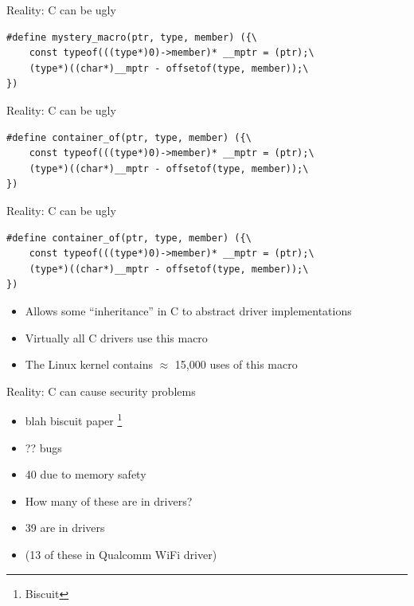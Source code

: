 \documentclass[NET,english,aspectratio=169,notitleframe]{tumbeamer}
\begin{document}
\begin{frame}[fragile]{Reality: C can be ugly}
\begin{verbatim}
#define mystery_macro(ptr, type, member) ({\
	const typeof(((type*)0)->member)* __mptr = (ptr);\
	(type*)((char*)__mptr - offsetof(type, member));\
})
\end{verbatim}
\end{frame}

\begin{frame}[fragile]{Reality: C can be ugly}
\begin{verbatim}
#define container_of(ptr, type, member) ({\
	const typeof(((type*)0)->member)* __mptr = (ptr);\
	(type*)((char*)__mptr - offsetof(type, member));\
})
\end{verbatim}
\end{frame}


\begin{frame}[fragile]{Reality: C can be ugly}
\begin{verbatim}
#define container_of(ptr, type, member) ({\
	const typeof(((type*)0)->member)* __mptr = (ptr);\
	(type*)((char*)__mptr - offsetof(type, member));\
})
\end{verbatim}
\begin{itemize}
\item Allows some ``inheritance'' in C to abstract driver implementations
\item Virtually all C drivers use this macro
\item The Linux kernel contains $\approx$ 15,000 uses of this macro
\end{itemize}
\end{frame}


\begin{frame}{Reality: C can cause security problems}
\begin{itemize}
\item blah biscuit paper \footnote{Biscuit}
\item ?? bugs
\item 40 due to memory safety
\vspace{1em}
\item How many of these are in drivers?
\pause
\item 39 are in drivers
\item (13 of these in Qualcomm WiFi driver)
\end{itemize}
\end{frame}
\end{document}
